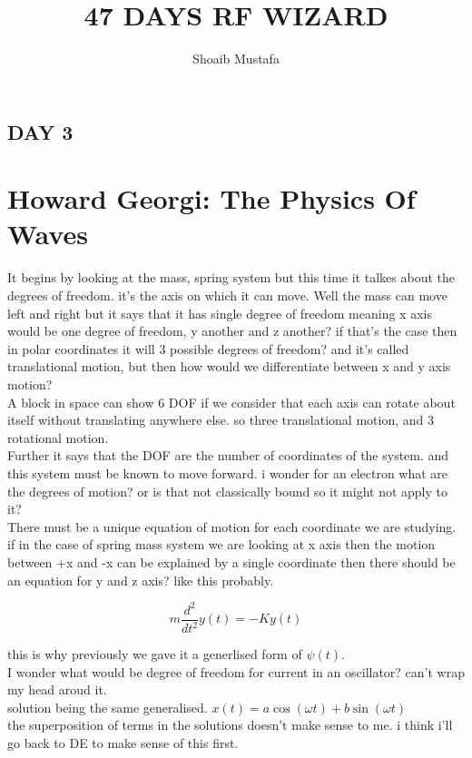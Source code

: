 \documentclass[12pt]{article}
\title{47 DAYS RF WIZARD}
\author{Shoaib Mustafa}
\begin{document}
\maketitle

\begin{center}
    \section*{DAY 3}
\end{center}

\section*{Howard Georgi: The Physics Of Waves}
It begins by looking at the mass, spring system but this time it talkes about the degrees of freedom. it's the axis on which it can move. 
Well the mass can move left and right but it says that it has single degree of freedom meaning x axis would be one degree of freedom, y another and z another? if that's the case then in polar coordinates it will 3 possible degrees of freedom? and it's called translational motion, but then how would we differentiate between x and y axis motion?
\\A block in space can show 6 DOF if we consider that each axis can rotate about itself without translating anywhere else. so three translational motion, and 3 rotational motion.
\\Further it says that the DOF are the number of coordinates of the system. and this system must be known to move forward. i wonder for an electron what are the degrees of motion? or is that not classically bound so it might not apply to it? 
\\There must be a unique equation of motion for each coordinate we are studying. if in the case of 
spring mass system we are looking at x axis then the motion between +x and -x can be explained by a single coordinate
then there should be an equation for y and z axis? like this probably. 

\begin{center}
    \begin{equation}
        m \frac{d^2}{dt^2} y(t) = -K y(t)    
    \end{equation}   
\end{center}
this is why previously we gave it a generlised form of $\psi(t)$.\\
I wonder what would be degree of freedom for current in an oscillator? can't wrap my head aroud it.
\\solution being the same generalised. $x(t) = a\cos(\omega t) + b\sin(\omega t)$
\\the superposition of terms in the solutions doesn't make sense to me. i think i'll go back to DE to make sense of this first. 
\end{document}
